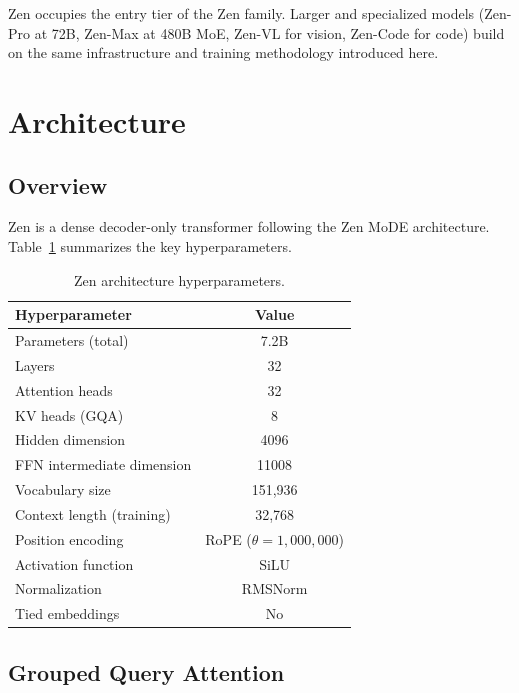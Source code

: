 \documentclass[11pt,a4paper]{article}
\begin{document}
Zen occupies the entry tier of the Zen family. Larger and specialized models (Zen-Pro at 72B,
Zen-Max at 480B MoE, Zen-VL for vision, Zen-Code for code) build on the same infrastructure and
training methodology introduced here.

\section{Architecture}

\subsection{Overview}

Zen is a dense decoder-only transformer following the Zen MoDE architecture. Table~\ref{tab:arch}
summarizes the key hyperparameters.

\begin{table}[H]
\centering
\caption{Zen architecture hyperparameters.}
\label{tab:arch}
\begin{tabular}{lc}
\toprule
\textbf{Hyperparameter} & \textbf{Value} \\
\midrule
Parameters (total)         & 7.2B \\
Layers                     & 32 \\
Attention heads            & 32 \\
KV heads (GQA)             & 8 \\
Hidden dimension           & 4096 \\
FFN intermediate dimension & 11008 \\
Vocabulary size            & 151{,}936 \\
Context length (training)  & 32{,}768 \\
Position encoding          & RoPE ($\theta = 1{,}000{,}000$) \\
Activation function        & SiLU \\
Normalization              & RMSNorm \\
Tied embeddings            & No \\
\bottomrule
\end{tabular}
\end{table}

\subsection{Grouped Query Attention}
\end{document}
